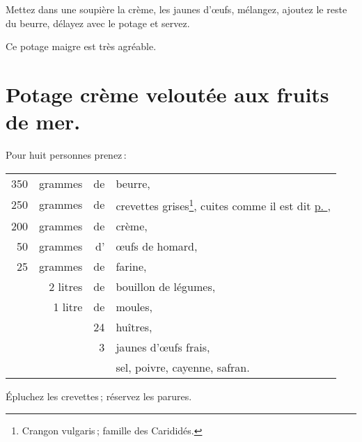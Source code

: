 Mettez dans une soupière la crème, les jaunes d'œufs, mélangez, ajoutez le reste
du beurre, délayez avec le potage et servez.

Ce potage maigre est très agréable.

\section*{\centering Potage crème veloutée aux fruits de mer.}

Pour huit personnes prenez :

\medskip

\footnotesize
\begin{longtable}{rrrp{16em}}                                                    
    350 & grammes  & de & beurre,                                                                         \\
    250 & grammes  & de & crevettes grises\footnote{Crangon vulgaris ; famille des Carididés.}, 
                          cuites comme il est dit \hyperlink{p0287-2}{p. \pageref{pg0287}},               \\
    200 & grammes  & de & crème,                                                                          \\
     50 & grammes  & d' & œufs de homard,                                                                 \\
     25 & grammes  & de & farine,                                                                         \\
        & 2 litres & de & bouillon de légumes,                                                            \\
        & 1 litre  & de & moules,                                                                         \\
        &          & 24 & huîtres,                                                                        \\
        &          &  3 & jaunes d'œufs frais,                                                            \\
        &          &    & sel, poivre, cayenne, safran.                                                   \\
\end{longtable}
\normalsize

Épluchez les crevettes ; réservez les parures.

